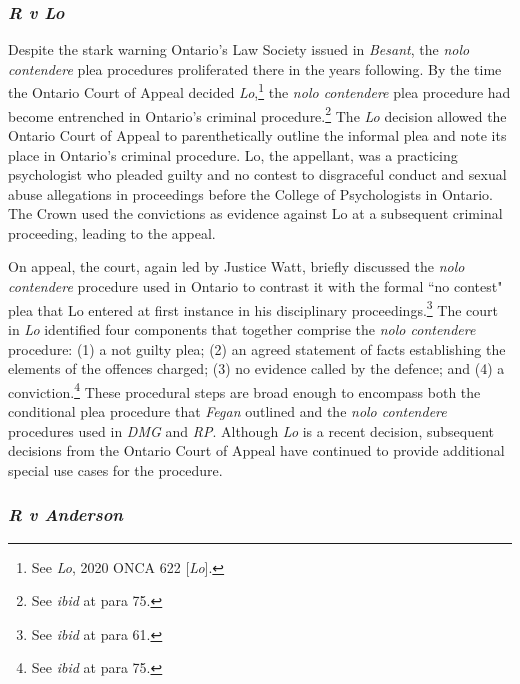\subsubsection{\textit{R v Lo}}

Despite the stark warning Ontario's Law Society issued in \textit{Besant}, the \textit{nolo contendere} plea procedures proliferated there in the years following. By the time the Ontario Court of Appeal decided \textit{Lo},\footnote{See \textit{Lo}, 2020 ONCA 622 [\textit{Lo}].} the \textit{nolo contendere} plea procedure had become entrenched in Ontario's criminal procedure.\footnote{See \textit{ibid} at para 75.} The \textit{Lo} decision allowed the Ontario Court of Appeal to parenthetically outline the informal plea and note its place in Ontario's criminal procedure. Lo, the appellant, was a practicing psychologist who pleaded guilty and no contest to disgraceful conduct and sexual abuse allegations in proceedings before the College of Psychologists in Ontario. The Crown used the convictions as evidence against Lo at a subsequent criminal proceeding, leading to the appeal.

On appeal, the court, again led by Justice Watt, briefly discussed the \textit{nolo contendere} procedure used in Ontario to contrast it with the formal ``no contest" plea that Lo entered at first instance in his disciplinary proceedings.\footnote{See \textit{ibid} at para 61.} The court in \textit{Lo} identified four components that together comprise the \textit{nolo contendere} procedure: (1) a not guilty plea; (2) an agreed statement of facts establishing the elements of the offences charged; (3) no evidence called by the defence; and (4) a conviction.\footnote{See \textit{ibid} at para 75.} These procedural steps are broad enough to encompass both the conditional plea procedure that \textit{Fegan} outlined and the \textit{nolo contendere} procedures used in \textit{DMG} and \textit{RP}. Although \textit{Lo} is a recent decision, subsequent decisions from the Ontario Court of Appeal have continued to provide additional special use cases for the procedure.

\subsubsection{\textit{R v Anderson}}

